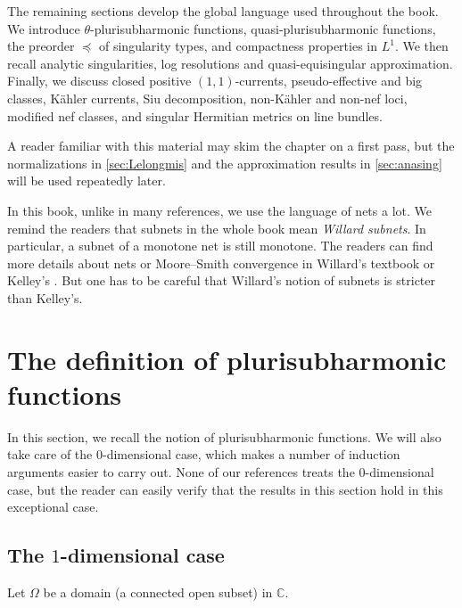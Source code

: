 The remaining sections develop the global language used throughout the book. We introduce $\theta$-plurisubharmonic functions, quasi-plurisubharmonic functions, the preorder $\preceq$ of singularity types, and compactness properties in $L^1$. We then recall analytic singularities, log resolutions and quasi-equisingular approximation. Finally, we discuss closed positive $(1,1)$-currents, pseudo-effective and big classes, K\"ahler currents, Siu decomposition, non-K\"ahler and non-nef loci, modified nef classes, and singular Hermitian metrics on line bundles.

A reader familiar with this material may skim the chapter on a first pass, but the normalizations in \cref{sec:Lelongmis} and the approximation results in \cref{sec:anasing} will be used repeatedly later.

In this book, unlike in many references, we use the language of nets a lot. We remind the readers that subnets in the whole book mean \emph{Willard subnets}. In particular, a subnet of a monotone net is still monotone. The readers can find more details about nets or Moore--Smith convergence in Willard's textbook \cite{Wil70} or Kelley's \cite{Kel75}. But one has to be careful that Willard's notion of subnets is stricter than Kelley's.


\section{The definition of plurisubharmonic functions}
\label{sec:pshdef}
In this section, we recall the notion of plurisubharmonic functions. We will also take care of the $0$-dimensional case, which makes a number of induction arguments easier to carry out.
None of our references treats the $0$-dimensional case, but the reader can easily verify that the results in this section hold in this exceptional case.

\subsection{The \texorpdfstring{$1$}{1}-dimensional case}
\label{subsec:psh_1d}
Let $\Omega$ be a domain (a connected open subset) in $\mathbb{C}$.

